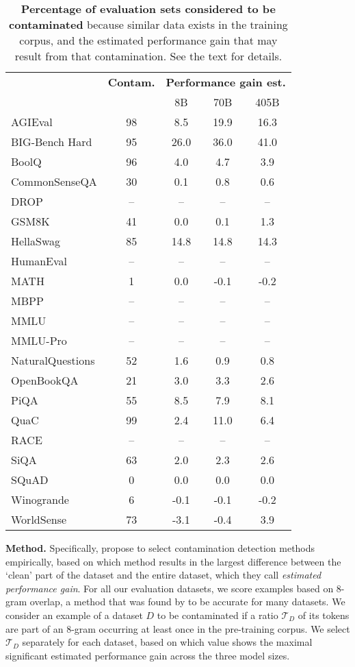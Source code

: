 \begin{wraptable}{r}{0.5\textwidth}
{\begin{tabular}{lcccc}
        \toprule
        & \textbf{Contam.} & \multicolumn{3}{c}{\textbf{Performance gain est.}}\\
        & & 8B & 70B & 405B \\
        \midrule
        AGIEval & 98 & 8.5 & 19.9 & 16.3 \\
        BIG-Bench Hard & 95 & 26.0 & 36.0 & 41.0 \\
        BoolQ & 96 & 4.0 & 4.7 & 3.9 \\
        CommonSenseQA & 30 & 0.1 & 0.8 & 0.6 \\
        DROP & -- & -- & -- & -- \\
        GSM8K & 41 & 0.0 & 0.1 & 1.3 \\
        HellaSwag & 85 & 14.8 & 14.8 & 14.3 \\
        HumanEval & -- & -- & -- & -- \\
        MATH & 1 & 0.0 & -0.1 & -0.2 \\
        MBPP & -- & -- & -- & -- \\
        MMLU & -- & -- & -- & -- \\
        MMLU-Pro & -- & -- & -- & -- \\
        NaturalQuestions & 52 & 1.6 & 0.9 & 0.8 \\
        OpenBookQA & 21 & 3.0 & 3.3 & 2.6 \\
        PiQA & 55 & 8.5 & 7.9 & 8.1 \\
        QuaC & 99 & 2.4 & 11.0 & 6.4 \\
        RACE & -- & -- & -- & -- \\
        SiQA & 63 & 2.0 & 2.3 & 2.6 \\
        SQuAD & 0 & 0.0 & 0.0 & 0.0 \\
        Winogrande & 6 & -0.1 & -0.1 & -0.2 \\
        WorldSense & 73 & -3.1 & -0.4 & 3.9 \\ %
        \bottomrule
    \end{tabular}
    }
    \caption{\textbf{Percentage of evaluation sets considered to be contaminated} because similar data exists in the training corpus, and the estimated performance gain that may result from that contamination. See the text for details. }
    \label{table:contamination}

\end{wraptable}

\textbf{Method.}
Specifically, \citet{singh2024contamination} propose to select contamination detection methods empirically, based on which method results in the largest difference between the `clean' part of the dataset and the entire dataset, which they call \emph{estimated performance gain}.
For all our evaluation datasets, we score examples based on 8-gram overlap, a method that was found by \citet{singh2024contamination} to be accurate for many datasets.
We consider an example of a dataset $D$ to be contaminated if a ratio $\mathcal{T}_D$ of its tokens are part of an 8-gram occurring at least once in the pre-training corpus.
We select $\mathcal{T}_D$ separately for each dataset, based on which value shows the maximal significant estimated performance gain across the three model sizes.



